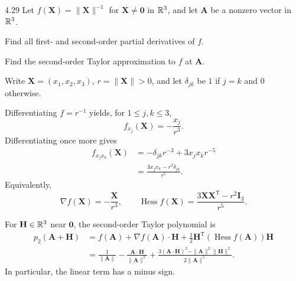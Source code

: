 \documentclass[11pt,oneside]{article}
\begin{document}
\begin{problem}{4.29}
Let $f(\mathbf X)=\|\mathbf X\|^{-1}$ for $\mathbf X\ne\mathbf0$
in $\mathbb{R}^3$, and let $\mathbf A$ be a nonzero vector in $\mathbb{R}^3$.
\begin{problemsubparts}
\item Find all first- and second-order partial derivatives of $f$.
\item Find the second-order Taylor approximation to $f$ at $\mathbf A$.
\end{problemsubparts}
\end{problem}
\begin{solution}
Write $\mathbf X=(x_1,x_2,x_3)$, $r=\|\mathbf X\|>0$,
and let $\delta_{jk}$ be $1$ if $j=k$ and $0$ otherwise.
\begin{problemsubparts}
\item Differentiating $f=r^{-1}$ yields, for $1\le j,k\le3$,
\[
 \boxed{f_{x_j}(\mathbf X)=-\frac{x_j}{r^3}}.
\]
Differentiating once more gives
\[
 \begin{aligned}
 f_{x_jx_k}(\mathbf X)
  &=-\delta_{jk}r^{-3}+3x_jx_kr^{-5}\\
  &=\boxed{\frac{3x_jx_k-r^2\delta_{jk}}{r^5}}.
 \end{aligned}
\]
Equivalently,
\[
 \nabla f(\mathbf X)=-\frac{\mathbf X}{r^3},\qquad
 \operatorname{Hess}f(\mathbf X)
  =\frac{3\mathbf X\mathbf X^{\mathsf T}-r^2\mathbf I_3}{r^5}.
\]
\item For $\mathbf H\in\mathbb{R}^3$ near $\mathbf0$, the second-order
Taylor polynomial is
\[
 \begin{aligned}
 p_2(\mathbf A+\mathbf H)
  &=f(\mathbf A)+\nabla f(\mathbf A)\cdot\mathbf H
    +\tfrac12\mathbf H^{\mathsf T}
      (\operatorname{Hess}f(\mathbf A))\mathbf H\\
  &=\boxed{\frac1{\|\mathbf A\|}
    -\frac{\mathbf A\cdot\mathbf H}{\|\mathbf A\|^3}
    +\frac{3(\mathbf A\cdot\mathbf H)^2
      -\|\mathbf A\|^2\|\mathbf H\|^2}{2\|\mathbf A\|^5}}.
 \end{aligned}
\]
In particular, the linear term has a minus sign.
\end{problemsubparts}
\end{solution}
\end{document}
